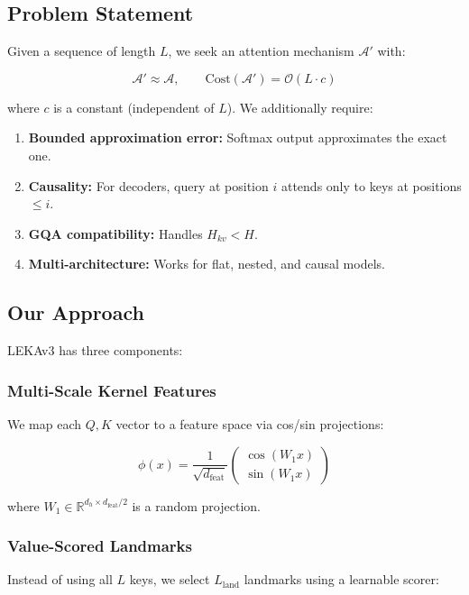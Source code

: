 \subsection{Problem Statement}

Given a sequence of length $L$, we seek an attention mechanism $\mathcal{A}'$ 
with:

\[
\mathcal{A}' \approx \mathcal{A}, \qquad
\text{Cost}(\mathcal{A}') = \mathcal{O}(L \cdot c)
\tag{1.3}
\]

where $c$ is a constant (independent of $L$). We additionally require:

\begin{enumerate}
\item \textbf{Bounded approximation error:} Softmax output approximates the exact one.
\item \textbf{Causality:} For decoders, query at position $i$ attends only to keys
  at positions $\leq i$.
\item \textbf{GQA compatibility:} Handles $H_{kv} < H$.
\item \textbf{Multi-architecture:} Works for flat, nested, and causal models.

\end{enumerate}
\subsection{Our Approach}

LEKAv3 has three components:

\subsubsection{Multi-Scale Kernel Features}

We map each $Q, K$ vector to a feature space via cos/sin projections:

\[
\phi(x) = \frac{1}{\sqrt{d_\text{feat}}} \begin{pmatrix} \cos(W_1 x) \\ \sin(W_1 x) \end{pmatrix}
\tag{1.4}
\]

where $W_1 \in \mathbb{R}^{d_h \times d_\text{feat}/2}$ is a random projection.

\subsubsection{Value-Scored Landmarks}

Instead of using all $L$ keys, we select $L_\text{land}$ landmarks using a 
learnable scorer:

